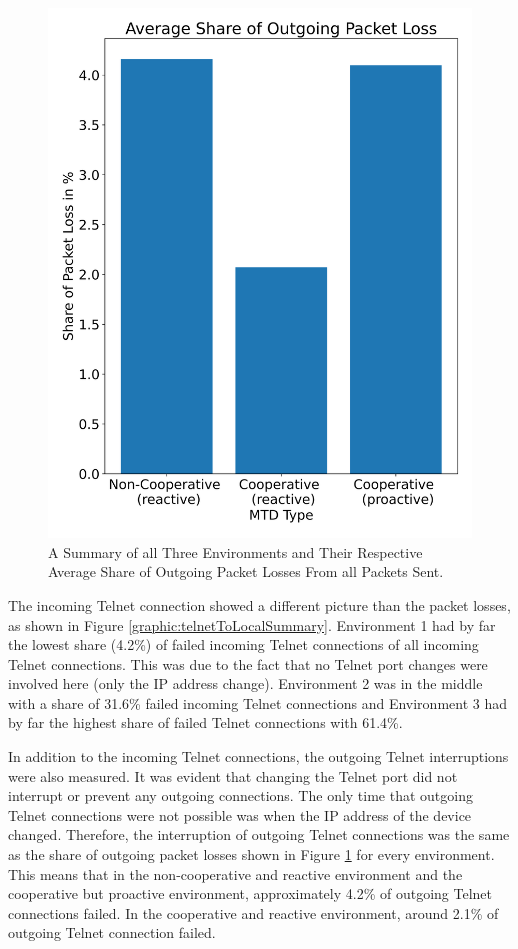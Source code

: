 \begin{figure}[tph]
\includegraphics[scale=0.4]{assets/packetLossSummary.png}
\centering
\caption{A Summary of all Three Environments and Their Respective Average Share of Outgoing Packet Losses From all Packets Sent.}
\label{graphic:packetLossSummary}
\end{figure}

The incoming Telnet connection showed a different picture than the packet losses, as shown in Figure \ref{graphic:telnetToLocalSummary}. Environment 1 had by far the lowest share (4.2\%) of failed incoming Telnet connections of all incoming Telnet connections. This was due to the fact that no Telnet port changes were involved here (only the IP address change). Environment 2 was in the middle with a share of 31.6\% failed incoming Telnet connections and Environment 3 had by far the highest share of failed Telnet connections with 61.4\%. 

In addition to the incoming Telnet connections, the outgoing Telnet interruptions were also measured. It was evident that changing the Telnet port did not interrupt or prevent any outgoing connections. The only time that outgoing Telnet connections were not possible was when the IP address of the device changed. Therefore, the interruption of outgoing Telnet connections was the same as the share of outgoing packet losses shown in Figure \ref{graphic:packetLossSummary} for every environment. This means that in the non-cooperative and reactive environment
and the cooperative but proactive environment, approximately 4.2\% of outgoing Telnet connections failed. In the cooperative and reactive environment, around 2.1\% of outgoing Telnet connection failed.



